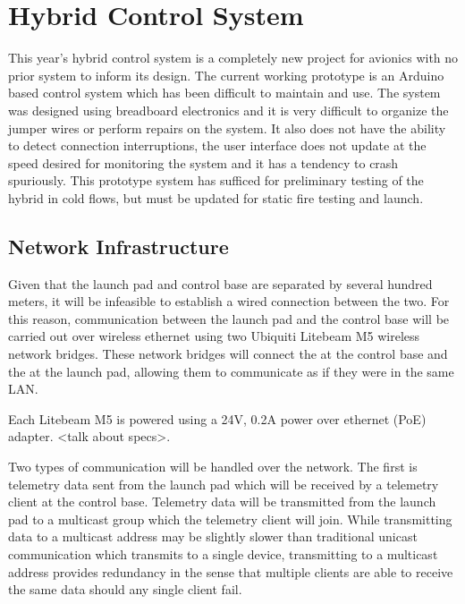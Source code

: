 \section{Hybrid Control System}

This year's hybrid control system is a completely new project for avionics with no prior system to inform its design.
The current working prototype is an Arduino based control system which has been difficult to maintain and use. The
system was designed using breadboard electronics and it is very difficult to organize the jumper wires or perform
repairs on the system. It also does not have the ability to detect connection interruptions, the user interface does not
update at the speed desired for monitoring the system and it has a tendency to crash spuriously. This prototype system
has sufficed for preliminary testing of the hybrid in cold flows, but must be updated for static fire testing and
launch.

\subsection{Network Infrastructure}

Given that the launch pad and control base are separated by several hundred meters, it will be infeasible to establish 
a wired connection between the two. For this reason, communication between the launch pad and the control base will be
carried out over wireless ethernet using two Ubiquiti Litebeam M5 wireless network bridges. These network bridges will connect 
the  at the control base and the  at the launch pad, allowing them to communicate as if they 
were in the same LAN.

Each Litebeam M5 is powered using a 24V, 0.2A power over ethernet (PoE) adapter. <talk about specs>. 

Two types of communication will be handled over the network. The first is telemetry data sent from the launch pad which will be 
received by a telemetry client at the control base. Telemetry data will be transmitted from the launch pad to a 
multicast group which the telemetry client will join. While transmitting data to a  multicast address may be 
slightly slower than traditional  unicast communication which transmits to a single device, transmitting to a 
multicast address provides redundancy in the sense that multiple clients are able to receive the same data should any single client
fail.

